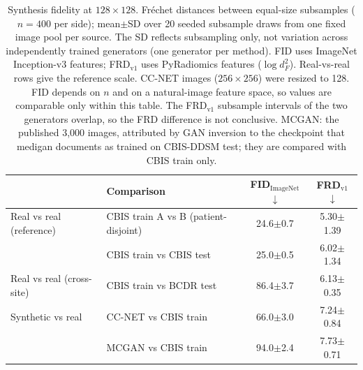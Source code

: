 \begin{table}[t]\centering\scriptsize\setlength{\tabcolsep}{4pt}
\caption{Synthesis fidelity at $128\times128$. Fr\'echet distances between equal-size subsamples ($n=400$ per side); mean$\pm$SD over 20 seeded subsample draws from one fixed image pool per source. The SD reflects subsampling only, not variation across independently trained generators (one generator per method). FID uses ImageNet Inception-v3 features; FRD$_\mathrm{v1}$ uses PyRadiomics features ($\log d_F^2$). Real-vs-real rows give the reference scale. CC-NET images ($256\times256$) were resized to 128. FID depends on $n$ and on a natural-image feature space, so values are comparable only within this table. The FRD$_\mathrm{v1}$ subsample intervals of the two generators overlap, so the FRD difference is not conclusive. MCGAN: the published 3{,}000 images, attributed by GAN inversion to the checkpoint that medigan documents as trained on CBIS-DDSM test; they are compared with CBIS train only.}
\label{tab:quality}
\begin{tabular}{llcc}
\toprule
 & Comparison & FID$_\mathrm{ImageNet}$ $\downarrow$ & FRD$_\mathrm{v1}$ $\downarrow$ \\
\midrule
Real vs real (reference) & CBIS train A vs B (patient-disjoint) & 24.6$\pm$0.7 & 5.30$\pm$1.39 \\
 & CBIS train vs CBIS test & 25.0$\pm$0.5 & 6.02$\pm$1.34 \\
\addlinespace
Real vs real (cross-site) & CBIS train vs BCDR test & 86.4$\pm$3.7 & 6.13$\pm$0.35 \\
\addlinespace
Synthetic vs real & CC-NET vs CBIS train & 66.0$\pm$3.0 & 7.24$\pm$0.84 \\
 & MCGAN vs CBIS train & 94.0$\pm$2.4 & 7.73$\pm$0.71 \\
\bottomrule
\end{tabular}
\end{table}
